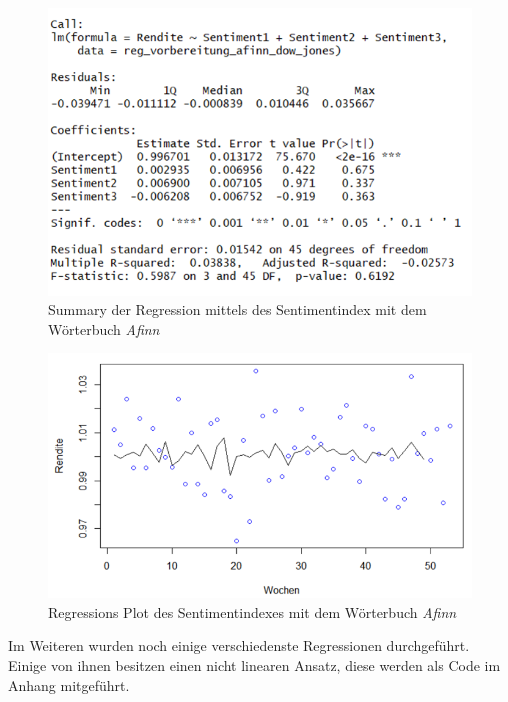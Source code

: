  \begin{figure}[H]
	\centering
	\includegraphics[width=1\textwidth]{Pictures/afinn_summary.png}
	\caption{Summary der Regression mittels des Sentimentindex mit dem Wörterbuch \textit{Afinn} }
	\label{Afinn_summary}
\end{figure} 
\begin{figure}[H]
	\centering
	\includegraphics[width=1\textwidth]{Pictures/Afinn_plot.png}
	\caption{Regressions Plot des Sentimentindexes mit dem Wörterbuch \textit{Afinn} }
	\label{Afinn_plot_regression}
\end{figure} 
Im Weiteren wurden noch einige verschiedenste Regressionen durchgeführt. Einige von ihnen besitzen einen nicht linearen Ansatz, diese werden als Code im Anhang mitgeführt.  

